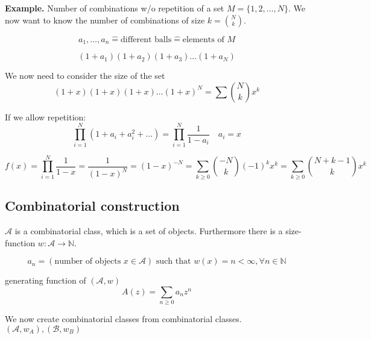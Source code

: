\textbf{Example.}
Number of combinations w/o repetition of a set $M = \{1,2, \ldots ,N\}$. We now want to know the number of combinations of size $k = {N \choose k}$.

\[
    a_1, \ldots , a_n \mathrel{\hat{=}} \text{different balls} \mathrel{\hat{=}} \text{elements of } M
\]

\[
    (1+a_1)(1+a_2)(1+a_3) \ldots (1+a_N)
\]

We now need to consider the size of the set
\[
    (1+x)(1+x)(1+x) \ldots (1+x)^N = \sum {N \choose k} x^k
\]

If we allow repetition:
\[
    \prod _{i=1}^N (1+a_i + a_i^2 + \ldots) = \prod _{i=1}^N \frac{1}{1-a_i} \quad a_i = x
\]

\[
    f(x) = \prod _{i=1}^N \frac{1}{1-x} = \frac{1}{(1-x)^N}
    = (1-x)^{-N}
    = \sum _{k \geq 0} {-N \choose k} (-1)^k x^k
    = \sum _{k \geq 0} {N + k-1 \choose k} x^k
\]

\subsection{Combinatorial construction}
$\mathcal{A}$ is a combinatorial class, which is a set of objects.
Furthermore there is a size-function $w: \mathcal{A} \rightarrow \mathbb{N}$.

\[
a_n = \left(\text{number of objects } x\in \mathcal{A}\right) \text{ such that }w(x) = n < \infty,  \forall n \in \mathbb{N}
\]

generating function of $(\mathcal{A}, w)$
\[
    A(z) = \sum_{n\geq 0 } a_n z^n
\]

We now create combinatorial classes from combinatorial classes.
$(\mathcal{A}, w_A) , (\mathcal{B}, w_B)$


